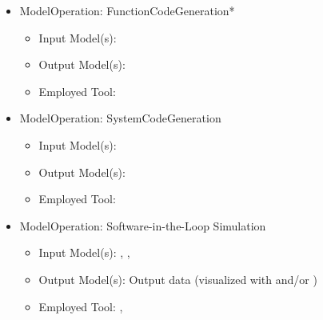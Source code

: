 
\begin{itemize}
    \item ModelOperation: FunctionCodeGeneration*
    \begin{itemize}
        \item Input Model(s): \CPSLabControlModel
        \item Output Model(s): \CPSLabControlModelCode
        \item Employed Tool: \dSPACETargetLink %
    \end{itemize}
    \item ModelOperation: SystemCodeGeneration
    \begin{itemize}
        \item Input Model(s): \CPSLabSystemModel
        \item Output Model(s): \CPSLabSystemModelCode
        \item Employed Tool: \dSPACESystemDesk %
    \end{itemize}
    \item ModelOperation: Software-in-the-Loop Simulation
    \begin{itemize}
        \item Input Model(s): \CPSLabControlModelCode*, \CPSLabSystemModelCode, \CPSLabRobotModel
        \item Output Model(s): Output data (visualized with \MATLABSimulinkSimulator and/or \FESTORobotinoView)
        \item Employed Tool: \DesktopExecution, \FESTORobotinoSim %
    \end{itemize}
\end{itemize}

 

